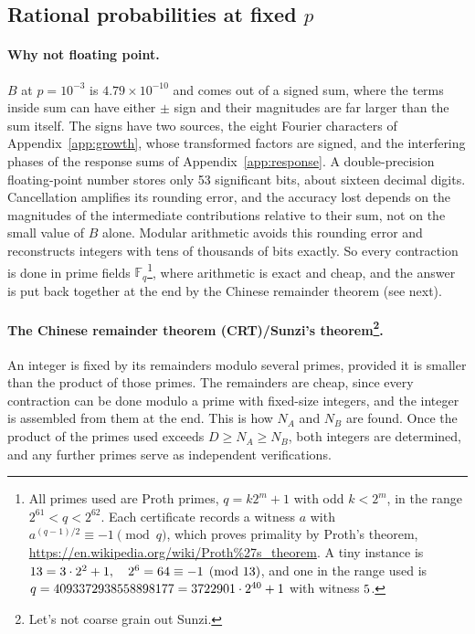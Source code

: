 \subsection{Rational probabilities at fixed \texorpdfstring{$p$}{p}}\label{app:F-fixedp}
\paragraph{Why not floating point.} 
$B$ at $p=10^{-3}$ is $4.79\times10^{-10}$ and comes out of a signed sum, where the terms inside sum can have either $\pm$ sign and their magnitudes are far larger than the sum itself.
The signs have two sources, the eight Fourier characters of Appendix~\ref{app:growth}, whose transformed factors are signed, and the interfering phases of the response sums of Appendix~\ref{app:response}.
A double-precision floating-point number stores only 53 significant bits, about sixteen decimal digits. Cancellation amplifies its rounding error, and the accuracy lost depends on the magnitudes of the intermediate contributions relative to their sum, not on the small value of $B$ alone. Modular arithmetic avoids this rounding error and reconstructs integers with tens of thousands of bits exactly.
So every contraction is done in prime fields $\mathbb F_q$\footnote{All primes used are Proth primes, $q=k2^m+1$ with odd $k<2^m$, in the range $2^{61}<q<2^{62}$. Each certificate records a witness $a$ with $a^{(q-1)/2}\equiv-1\pmod q$, which proves primality by Proth's theorem, \url{https://en.wikipedia.org/wiki/Proth\%27s_theorem}. A tiny instance is $13=3\cdot2^2+1,\quad 2^{6}=64\equiv-1\pmod{13}$, and one in the range used is $q=4093372938558898177=3722901\cdot2^{40}+1$ with witness $5$.}, where arithmetic is exact and cheap, and the answer is put back together at the end by the Chinese remainder theorem (see next).

\paragraph{The Chinese remainder theorem (CRT)/Sunzi's theorem\footnote{Let's not coarse grain out Sunzi.}.} An integer is fixed by its remainders modulo several primes, provided it is smaller than the product of those primes. The remainders are cheap, since every contraction can be done modulo a prime with fixed-size integers, and the integer is assembled from them at the end. This is how $N_A$ and $N_B$ are found. Once the product of the primes used exceeds $D\ge N_A\ge N_B$, both integers are determined, and any further primes serve as independent verifications.

